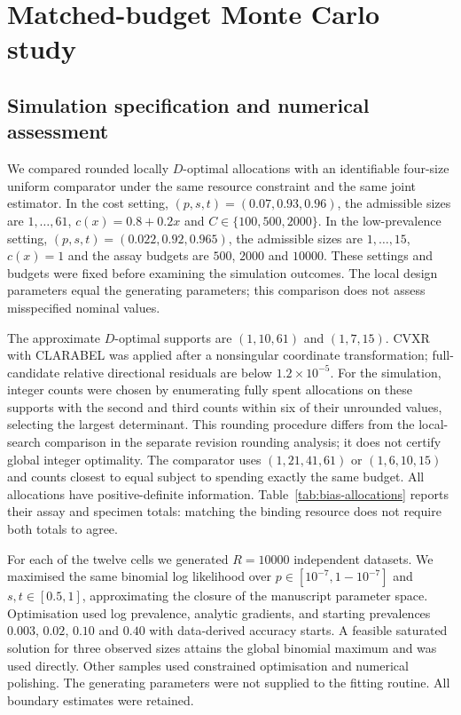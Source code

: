 \documentclass[11pt]{article}
\begin{document}
\section{Matched-budget Monte Carlo study}
\subsection{Simulation specification and numerical assessment}\label{app:bias-simulation}
We compared rounded locally $D$-optimal allocations with an identifiable four-size uniform comparator under the same resource constraint and the same joint estimator. In the cost setting, $(p,s,t)=(0.07,0.93,0.96)$, the admissible sizes are $1,\ldots,61$, $c(x)=0.8+0.2x$ and $C\in\{100,500,2000\}$. In the low-prevalence setting, $(p,s,t)=(0.022,0.92,0.965)$, the admissible sizes are $1,\ldots,15$, $c(x)=1$ and the assay budgets are $500$, $2000$ and $10000$. These settings and budgets were fixed before examining the simulation outcomes. The local design parameters equal the generating parameters; this comparison does not assess misspecified nominal values.

The approximate $D$-optimal supports are $(1,10,61)$ and $(1,7,15)$. CVXR with CLARABEL was applied after a nonsingular coordinate transformation; full-candidate relative directional residuals are below $1.2\times10^{-5}$. For the simulation, integer counts were chosen by enumerating fully spent allocations on these supports with the second and third counts within six of their unrounded values, selecting the largest determinant. This rounding procedure differs from the local-search comparison in the separate revision rounding analysis; it does not certify global integer optimality. The comparator uses $(1,21,41,61)$ or $(1,6,10,15)$ and counts closest to equal subject to spending exactly the same budget. All allocations have positive-definite information. Table~\ref{tab:bias-allocations} reports their assay and specimen totals: matching the binding resource does not require both totals to agree.

For each of the twelve cells we generated $R=10000$ independent datasets. We maximised the same binomial log likelihood over $p\in[10^{-7},1-10^{-7}]$ and $s,t\in[0.5,1]$, approximating the closure of the manuscript parameter space. Optimisation used log prevalence, analytic gradients, and starting prevalences $0.003$, $0.02$, $0.10$ and $0.40$ with data-derived accuracy starts. A feasible saturated solution for three observed sizes attains the global binomial maximum and was used directly. Other samples used constrained optimisation and numerical polishing. The generating parameters were not supplied to the fitting routine. All boundary estimates were retained.
\end{document}
